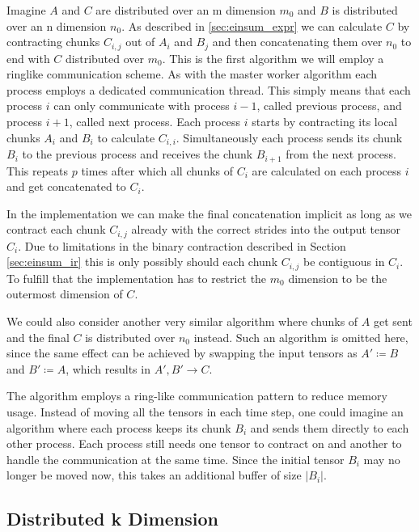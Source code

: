 Imagine $A$ and $C$ are distributed over an m dimension $m_0$ and $B$ is distributed over an n dimension $n_0$.
As described in \ref{sec:einsum_expr} we can calculate $C$ by contracting chunks $C_{i,j}$ out of $A_i$ and $B_j$ and then concatenating them over $n_0$ to end with $C$ distributed over $m_0$.
This is the first algorithm we will employ a ringlike communication scheme.
As with the master worker algorithm each process employs a dedicated communication thread.
This simply means that each process $i$ can only communicate with process $i-1$, called previous process, and process $i+1$, called next process.
Each process $i$ starts by contracting its local chunks $A_i$ and $B_i$ to calculate $C_{i,i}$.
Simultaneously each process sends its chunk $B_i$ to the previous process and receives the chunk $B_{i+1}$ from the next process.
This repeats $p$ times after which all chunks of $C_{i}$ are calculated on each process $i$ and get concatenated to $C_i$.

In the implementation we can make the final concatenation implicit as long as we contract each chunk $C_{i,j}$ already with the correct strides into the output tensor $C_i$.
Due to limitations in the binary contraction described in Section \ref{sec:einsum_ir} this is only possibly should each chunk $C_{i,j}$ be contiguous in $C_i$.
To fulfill that the implementation has to restrict the $m_0$ dimension to be the outermost dimension of $C$.

We could also consider another very similar algorithm where chunks of $A$ get sent and the final $C$ is distributed over $n_0$ instead.
Such an algorithm is omitted here, since the same effect can be achieved by swapping the input tensors as $A' \coloneqq B$ and $B' \coloneqq A$, which results in $A',B' \rightarrow C$.

The algorithm employs a ring-like communication pattern to reduce memory usage.
Instead of moving all the tensors in each time step, one could imagine an algorithm where each process keeps its chunk $B_i$ and sends them directly to each other process.
Each process still needs one tensor to contract on and another to handle the communication at the same time.
Since the initial tensor $B_i$ may no longer be moved now, this takes an additional buffer of size $|B_i|$.

\subsection{Distributed k Dimension}


